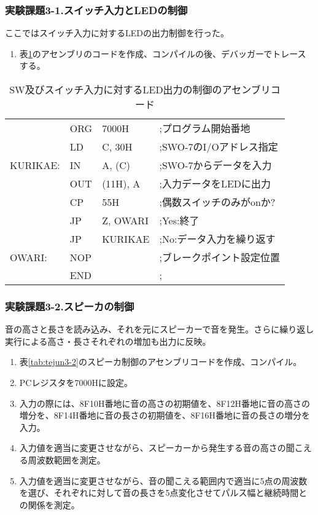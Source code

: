 \documentclass[11pt,a4j]{jsarticle}
\begin{document}
   \subsubsection{実験課題3-1.スイッチ入力とLEDの制御}
   ここではスイッチ入力に対するLEDの出力制御を行った。
   \begin{enumerate}
   \item 表\ref{tab:tejun3-1}のアセンブリのコードを作成、コンパイルの後、デバッガーでトレースする。
   \end{enumerate}
   
   \begin{table}[htb]
  \begin{center}
    \caption{SW及びスイッチ入力に対するLED出力の制御のアセンブリコード}
    \begin{tabular}{|llll|} \hline
 & ORG & 7000H & ;プログラム開始番地 \\
 & LD & C, 30H & ;SWO-7のI/Oアドレス指定 \\
KURIKAE: & IN & A, (C) & ;SWO-7からデータを入力 \\
 & OUT & (11H), A & ;入力データをLEDに出力 \\
 & CP & 55H & ;偶数スイッチのみがonか? \\
 & JP & Z, OWARI & ;Yes:終了 \\
 & JP & KURIKAE & ;No:データ入力を繰り返す \\
OWARI: & NOP &  & ;ブレークポイント設定位置 \\
 & END &  & ; \\ \hline
    \end{tabular}
    \label{tab:tejun3-1}
  \end{center}
 \end{table}
   
   \subsubsection{実験課題3-2.スピーカの制御}
   音の高さと長さを読み込み、それを元にスピーカーで音を発生。さらに繰り返し実行による高さ・長さそれぞれの増加も出力に反映。
   \begin{enumerate}
   \item 表\ref{tab:tejun3-2}のスピーカ制御のアセンブリコードを作成、コンパイル。
   \item PCレジスタを7000Hに設定。
   \item 入力の際には、8F10H番地に音の高さの初期値を、8F12H番地に音の高さの増分を、8F14H番地に音の長さの初期値を、8F16H番地に音の長さの増分を入力。
   \item 入力値を適当に変更させながら、スピーカーから発生する音の高さの聞こえる周波数範囲を測定。
   \item 入力値を適当に変更させながら、音の聞こえる範囲内で適当に5点の周波数を選び、それぞれに対して音の長さを5点変化させてパルス幅と継続時間との関係を測定。
   \end{enumerate}
   
\end{document}
